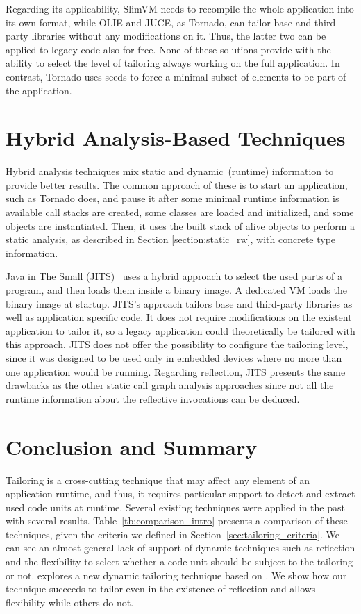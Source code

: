 Regarding its applicability, SlimVM needs to recompile the whole application into its own format, while OLIE and JUCE, as Tornado, can tailor base and third party libraries without any modifications on it. Thus, the latter two can be applied to legacy code also for free. None of these solutions provide with the ability to select the level of tailoring always working on the full application. In contrast, Tornado uses seeds to force a minimal subset of elements to be part of the application.


\section{Hybrid Analysis-Based Techniques}\label{section:hybrid_rw}

Hybrid analysis techniques mix static and dynamic~(\ie runtime) information to provide better results. The common approach of these is to start an application, such as Tornado does, and pause it after some minimal runtime information is available \ie call stacks are created, some classes are loaded and initialized, and some objects are instantiated. Then, it uses the built stack of alive objects to perform a static analysis, as described in Section \ref{section:static_rw}, with concrete type information.

Java in The Small (JITS)~\cite{Cour10a} uses a hybrid approach to select the used parts of a program, and then loads them inside a binary image. A dedicated VM loads the binary image at startup. JITS's approach tailors base and third-party libraries as well as application specific code. It does not require modifications on the existent application to tailor it, so a legacy application could theoretically be tailored with this approach. JITS does not offer the possibility to configure the tailoring level, since it was designed to be used only in embedded devices where no more than one application would be running. Regarding reflection, JITS presents the same drawbacks as the other static call graph analysis approaches since not all the runtime information about the reflective invocations can be deduced.

\section{Conclusion and Summary}

Tailoring is a cross-cutting technique that may affect any element of an application runtime, and thus, it requires particular support to detect and extract used code units at runtime. Several existing techniques were applied in the past with several results.
Table~\ref{tb:comparison_intro} presents a comparison of these techniques, given the criteria we defined in Section~\ref{sec:tailoring_criteria}.
We can see an almost general lack of support of dynamic techniques such as reflection and the flexibility to select whether a code unit should be subject to the tailoring or not.  explores a new dynamic tailoring technique based on \Vtt. We show how our technique succeeds to tailor even in the existence of reflection and allows flexibility while others do not.

